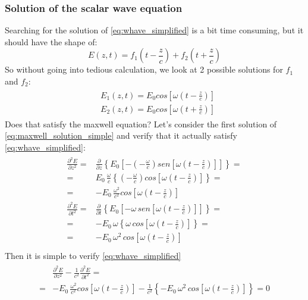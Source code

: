 \subsubsection*{Solution of the scalar wave equation}
Searching for the solution of \cref{eq:whave_simplified} is a bit time consuming, but it should have the shape of:
\begin{equation}
    E(z,t)=f_1\left(t-\frac{z}{c}\right)+f_2\left(t+\frac{z}{c}\right)
\end{equation}
So without going into tedious calculation, we look at 2 possible solutions for $f_1$ and $f_2$:
\begin{align}\label{eq:maxwell_solution_simple}
    \begin{split}
        &E_1(z,t)=E_0 cos\left[\omega\left(t-\frac{z}{c}\right)\right]\\[5pt]
        &E_2(z,t)=E_0 cos\left[\omega\left(t+\frac{z}{c}\right)\right]
    \end{split}
\end{align}
Does that satisfy the maxwell equation? Let's consider the first solution of \cref{eq:maxwell_solution_simple} and verify that it actually satisfy \cref{eq:whave_simplified}:
\begin{align*}
    \begin{split}
        \frac{\partial^2E}{\partial z^2}=&\frac{\partial}{\partial z}\left\{E_0\left[-\left(-\frac{\omega}{c}\right)sen\left[\omega\left(t-\frac{z}{c}\right)\right]\right]\right\}=\\[5pt]
        =&E_0\,\frac{\omega}{c}\left\{\left(-\frac{\omega}{c}\right)cos\left[\omega\left(t-\frac{z}{c}\right)\right]\right\}=\\[5pt]
        =&-E_0\,\frac{\omega^2}{c^2}cos\left[\omega\left(t-\frac{z}{c}\right)\right]\\[10pt]
        \frac{\partial^2E}{\partial t^2}=&\frac{\partial}{\partial t}\left\{E_0\left[-\omega\, sen\left[\omega\left(t-\frac{z}{c}\right)\right]\right]\right\}=\\[5pt]
        =&-E_0\,\omega\left\{\omega \, cos\left[\omega\left(t-\frac{z}{c}\right)\right]\right\}=\\[5pt]
        =&-E_0\,\omega^2\,cos\left[\omega\left(t-\frac{z}{c}\right)\right]\\[10pt]
    \end{split}
\end{align*}
Then it is simple to verify \cref{eq:whave_simplified}
\begin{align*}
    \begin{split}
    &\frac{\partial^2E}{\partial z^2}-\frac{1}{c^2} \frac{\partial^2E}{\partial t^2}=\\[5pt]
    =&-E_0\,\frac{\omega^2}{c^2}cos\left[\omega\left(t-\frac{z}{c}\right)\right]-\frac{1}{c^2}\left\{-E_0\,\omega^2\,cos\left[\omega\left(t-\frac{z}{c}\right)\right]\right\}=0
    \end{split}
\end{align*}
